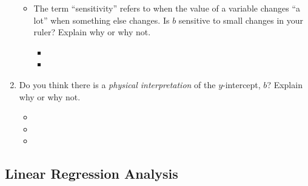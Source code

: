 \documentclass[12pt,letterpaper]{memoir}
\begin{document}
\begin{enumerate}[fullwidth,label={\Large$\bm{\square}$}\,\arabic*.,resume]
\begin{itemize}
                \underline{\hspace{0.5in}}
            \item The term ``sensitivity'' refers to when the value of a variable 
                changes ``a lot'' when something else changes. 
                Is $b$ sensitive to small changes in your ruler? 
                Explain why or why not. \hrulefill
                \begin{itemize}[fullwidth]
                    \item[] \hrulefill 
                    \item[] \hrulefill 
                \end{itemize}
        \end{itemize}
    \item Do you think there is a {\itshape physical interpretation} of 
        the $y$-intercept, $b$? Explain why or why not. \hrulefill 
        \begin{itemize}
            \item[] \hrulefill 
            \item[] \hrulefill 
            \item[] \hrulefill 
        \end{itemize}
\end{enumerate}

\subsection*{Linear Regression Analysis}
\end{document}
